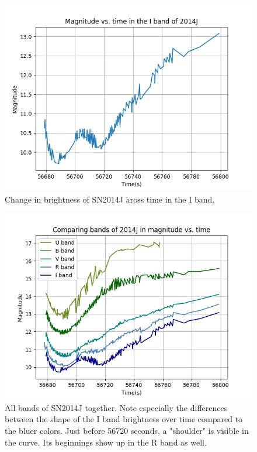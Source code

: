 \begin{figure}[h]
	\includegraphics[width=1.0\textwidth]{2014J_I_magvstime.png}
	\caption{Change in brightness of SN2014J aross time in the I band.}
\end{figure}
\begin{figure}[h]
	\includegraphics[width=1.0\textwidth]{2014J_all_magvstime.png}
	\caption{All bands of SN2014J together. Note especially the differences between the shape of the I band brightness over time compared to the bluer colors. Just before 56720 seconds, a "shoulder" is visible in the curve. Its beginnings show up in the R band as well.}
\end{figure}



